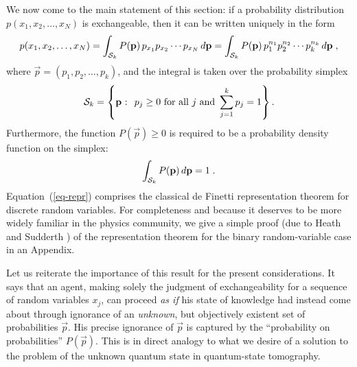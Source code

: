 We now come to the main statement of this section:
if a probability distribution $p(x_1,x_2,\ldots,x_N)$ is exchangeable,
then it can be written uniquely in the form
\begin{equation}
p(x_1,x_2,\ldots,x_N)=\int_{{\cal S}_k} P(\vec{p})\,p_{x_1}
p_{x_2} \cdots p_{x_N}\,d\vec{p}
=
\int_{{\cal S}_k} P(\vec{p})\, p_1^{n_{\scriptscriptstyle 1}}
p_2^{n_{\scriptscriptstyle 2}}\cdots p_k^{n_{\scriptscriptstyle k}} \,
d\vec{p}\;,
\label{eq-repr}
\end{equation}
where $\vec{p}=(p_1,p_2,\ldots,p_k)$, and the integral is taken over
the probability simplex
\begin{equation}
{\cal S}_k=\left\{\vec{p}\mbox{ : }\; p_j\ge0\mbox{ for all } j\mbox{
and } \sum_{j=1}^k p_j=1\right\}.
\end{equation}
Furthermore, the function $P(\vec{p})\ge0$ is required to be a
probability density function on the simplex:
\begin{equation}
\int_{{\cal S}_k} P(\vec{p})\,d\vec{p}=1\;.
\end{equation}
Equation~(\ref{eq-repr}) comprises the classical de Finetti
representation theorem for discrete random variables. For
completeness and because it deserves to be more widely familiar in
the physics community, we give a simple proof (due to Heath and
Sudderth \cite{Heath1976}) of the representation theorem for the
binary random-variable case in an Appendix.

Let us reiterate the importance of this result for the present
considerations.  It says that an agent, making solely the
judgment of exchangeability for a sequence of random variables
$x_j$, can proceed {\it as if\/} his state of knowledge had
instead come about through ignorance of an {\it unknown}, but
objectively existent set of probabilities $\vec{p}$.  His precise
ignorance of $\vec{p}$ is captured by the ``probability on
probabilities'' $P(\vec{p})$.  This is in direct analogy to what
we desire of a solution to the problem of the unknown quantum
state in quantum-state tomography.

